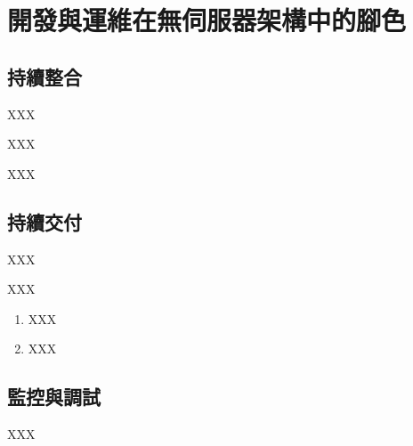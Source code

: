 \chapter{開發與運維在無伺服器架構中的腳色}
\renewcommand{\baselinestretch}{10} %
\section{持續整合}
\par
\renewcommand{\baselinestretch}{1} %
\twelve XXX\\
\par
\renewcommand{\baselinestretch}{1} %
\twelve XXX\\
\par
\renewcommand{\baselinestretch}{1} %
\twelve XXX
\par

\renewcommand{\baselinestretch}{20} %
\section{持續交付}
\par
\renewcommand{\baselinestretch}{1} %
\twelve XXX\\
\par
\renewcommand{\baselinestretch}{1} %
\twelve XXX
\begin{enumerate}
	\item XXX
	\item XXX
\end{enumerate}
\par

\renewcommand{\baselinestretch}{20} %
\section{監控與調試}
\par
\renewcommand{\baselinestretch}{1} %
\twelve XXX
\par
